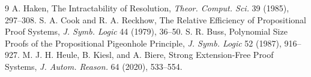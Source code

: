\documentclass[11pt]{article}
\begin{document}
\begin{thebibliography}{9}
 A. Haken, The Intractability of Resolution, \emph{Theor. Comput. Sci.} 39 (1985), 297--308.
 S. A. Cook and R. A. Reckhow, The Relative Efficiency of Propositional Proof Systems, \emph{J. Symb. Logic} 44 (1979), 36--50.
 S. R. Buss, Polynomial Size Proofs of the Propositional Pigeonhole Principle, \emph{J. Symb. Logic} 52 (1987), 916--927.
 M. J. H. Heule, B. Kiesl, and A. Biere, Strong Extension-Free Proof Systems, \emph{J. Autom. Reason.} 64 (2020), 533--554.
\end{thebibliography}
\end{document}
